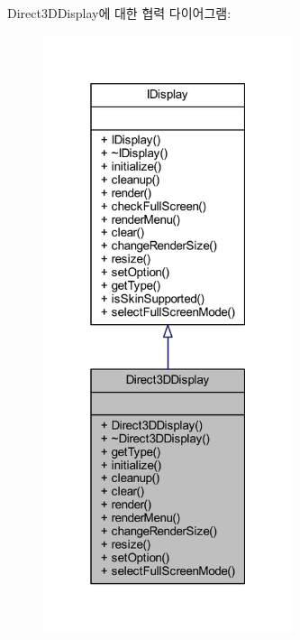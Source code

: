 Direct3\+D\+Display에 대한 협력 다이어그램\+:\nopagebreak
\begin{figure}[H]
\begin{center}
\leavevmode
\includegraphics[width=208pt]{class_direct3_d_display__coll__graph}
\end{center}
\end{figure}
